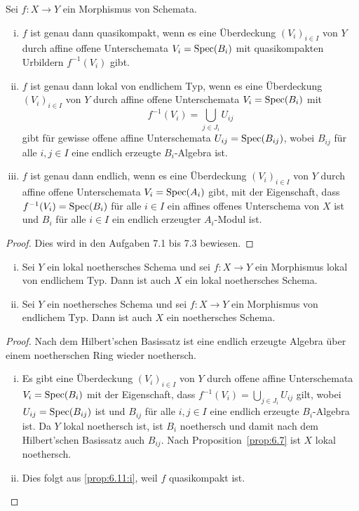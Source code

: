\begin{prop}
\label{prop:6.10}
	Sei $f\colon X \to Y$ ein Morphismus von Schemata.
	\begin{enumerate}[i)]
		\item $f$ ist genau dann quasikompakt, wenn es eine Überdeckung $(V_i)_{i\in I}$ von $Y$ durch affine offene Unterschemata $V_i = \operatorname{Spec}(B_i)$ mit quasikompakten Urbildern $f^{-1}(V_i)$ gibt.
		\item $f$ ist genau dann lokal von endlichem Typ, wenn es eine Überdeckung $(V_i)_{i \in I}$ von $Y$ durch affine offene Unterschemata $V_i = \operatorname{Spec}(B_i)$ mit
		\[
			f^{-1}(V_i) = \bigcup_{j \in J_i}U_{ij}
		\]
		gibt für gewisse offene affine Unterschemata $U_{ij} = \operatorname{Spec}(B_{ij})$, wobei $B_{ij}$ für alle $i,j \in I$  eine endlich erzeugte $B_i$-Algebra ist.
		\item $f$ ist genau dann endlich, wenn es eine Überdeckung $(V_i)_{i \in I}$ von $Y$ durch affine offene Unterschemata $V_i = \operatorname{Spec}(A_i)$ gibt, mit der Eigenschaft, dass $f^{-1}(V_i) = \operatorname{Spec}(B_i)$ für alle $i \in I$ ein affines offenes Unterschema von $X$ ist und $B_i$ für alle $i \in I$ ein endlich erzeugter $A_i$-Modul ist.
	\end{enumerate}
	\begin{proof}
		Dies wird in den Aufgaben 7.1 bis 7.3 bewiesen.
	\end{proof}
\end{prop}

\begin{prop}
\label{prop:6.11}
	\begin{enumerate}[i)]
		\item\label{prop:6.11:i} Sei $Y$ ein lokal noethersches Schema und sei $f\colon X \to Y$ ein Morphismus lokal von endlichem Typ. Dann ist auch $X$ ein lokal noethersches Schema.
		\item Sei $Y$ ein noethersches Schema und sei $f \colon X \to Y$ ein Morphismus von endlichem Typ. Dann ist auch $X$ ein noethersches Schema.
	\end{enumerate}
	\begin{proof}
		Nach dem Hilbert'schen Basissatz ist eine endlich erzeugte Algebra über einem noetherschen Ring wieder noethersch.
		\begin{enumerate}[i)]
			\item Es gibt eine Überdeckung $(V_i)_{i \in I}$ von $Y$ durch offene affine Unterschemata $V_i=\operatorname{Spec}(B_i)$ mit der Eigenschaft, dass $f^{-1}(V_i) = \bigcup_{j \in J_i} U_{ij}$ gilt, wobei $U_{ij} = \operatorname{Spec}(B_{ij})$ ist und $B_{ij}$ für alle $i,j \in I$ eine endlich erzeugte $B_i$-Algebra ist. Da $Y$ lokal noethersch ist, ist $B_i$ noethersch und damit nach dem Hilbert'schen Basissatz auch $B_{ij}$. Nach Proposition~\ref{prop:6.7} ist $X$ lokal noethersch.
			\item Dies folgt aus \ref{prop:6.11:i}, weil $f$ quasikompakt ist.
		\end{enumerate}
	\end{proof}
\end{prop}

